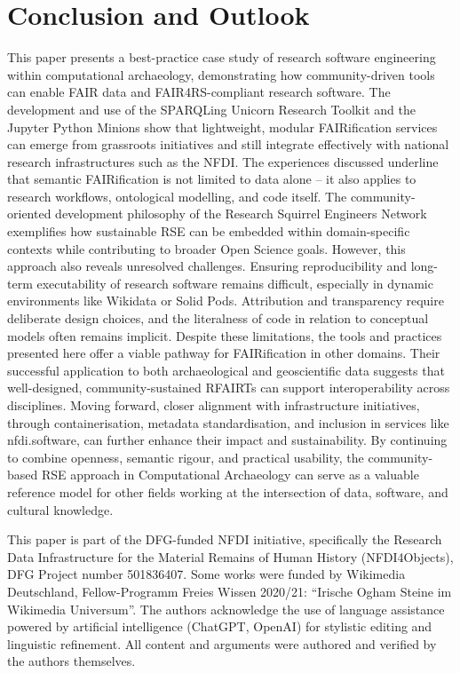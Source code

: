 \documentclass{eceasst}
\begin{document}
\section{Conclusion and Outlook}
\label{sec:conclusion}

This paper presents a best-practice case study of research software engineering within computational archaeology, demonstrating how community-driven tools can enable FAIR data and FAIR4RS-compliant research software. The development and use of the SPARQLing Unicorn Research Toolkit and the Jupyter Python Minions show that lightweight, modular FAIRification services can emerge from grassroots initiatives and still integrate effectively with national research infrastructures such as the NFDI. The experiences discussed underline that semantic FAIRification is not limited to data alone – it also applies to research workflows, ontological modelling, and code itself. The community-oriented development philosophy of the Research Squirrel Engineers Network exemplifies how sustainable RSE can be embedded within domain-specific contexts while contributing to broader Open Science goals. However, this approach also reveals unresolved challenges. Ensuring reproducibility and long-term executability of research software remains difficult, especially in dynamic environments like Wikidata or Solid Pods. Attribution and transparency require deliberate design choices, and the literalness of code in relation to conceptual models often remains implicit. Despite these limitations, the tools and practices presented here offer a viable pathway for FAIRification in other domains. Their successful application to both archaeological and geoscientific data suggests that well-designed, community-sustained RFAIRTs can support interoperability across disciplines. Moving forward, closer alignment with infrastructure initiatives, through containerisation, metadata standardisation, and inclusion in services like nfdi.software, can further enhance their impact and sustainability. By continuing to combine openness, semantic rigour, and practical usability, the community-based RSE approach in Computational Archaeology can serve as a valuable reference model for other fields working at the intersection of data, software, and cultural knowledge.

\begin{acknowledge}
This paper is part of the DFG-funded NFDI initiative, specifically the Research Data Infrastructure for the Material Remains of Human History (NFDI4Objects), DFG Project number 501836407. Some works were funded by Wikimedia Deutschland, Fellow-Programm Freies Wissen 2020/21: “Irische Ogham Steine im Wikimedia Universum”. The authors acknowledge the use of language assistance powered by artificial intelligence (ChatGPT, OpenAI) for stylistic editing and linguistic refinement. All content and arguments were authored and verified by the authors themselves.
\end{acknowledge}

\nocite{*}


\end{document}
